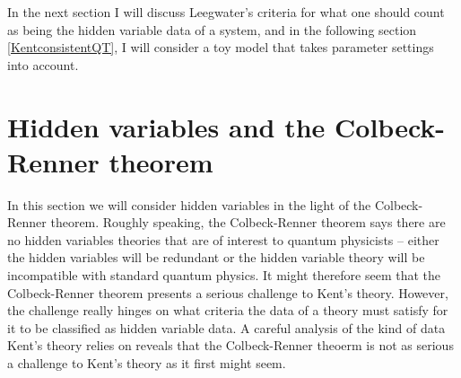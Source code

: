 In the next section I will discuss Leegwater's criteria for what one should count as being the hidden variable data of a system, and in the following section \ref{KentconsistentQT}, I will consider a toy model that takes parameter settings into account.


\section{Hidden variables and the Colbeck-Renner theorem\label{colbeckrennerthm}}
In this section we will consider hidden variables in the light of the Colbeck-Renner theorem. Roughly speaking, the Colbeck-Renner theorem says there are no hidden variables theories that are of interest to quantum physicists -- either the hidden variables will be redundant or the hidden variable theory will be incompatible with standard quantum physics. It might therefore seem that the Colbeck-Renner theorem presents a serious challenge to Kent's theory. However, the challenge really hinges on what criteria the data of a theory must satisfy for it to be classified as hidden variable data. A careful analysis of the kind of data Kent's theory relies on reveals that the Colbeck-Renner theoerm is not as serious a challenge to Kent's theory as it first might seem. 

